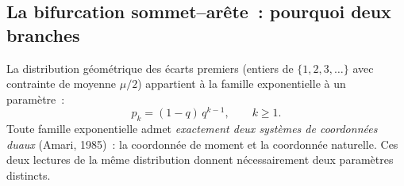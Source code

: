 \documentclass[12pt,a4paper]{article}
\begin{document}
\subsection{La bifurcation sommet--ar\^ete~: pourquoi deux branches}
\label{app:branches}

La distribution g\'eom\'etrique des \'ecarts premiers (entiers de
$\{1,2,3,\ldots\}$ avec contrainte de moyenne $\mu/2$) appartient \`a
la famille exponentielle \`a un param\`etre~:
\begin{equation}
  p_k = (1-q)\,q^{k-1}, \qquad k \geq 1.
  \tag{A.5}
\end{equation}
Toute famille exponentielle admet \emph{exactement deux syst\`emes
de coordonn\'ees duaux} (Amari, 1985)~: la coordonn\'ee de moment
et la coordonn\'ee naturelle. Ces deux lectures de la m\^eme distribution
donnent n\'ecessairement deux param\`etres distincts.
\end{document}
